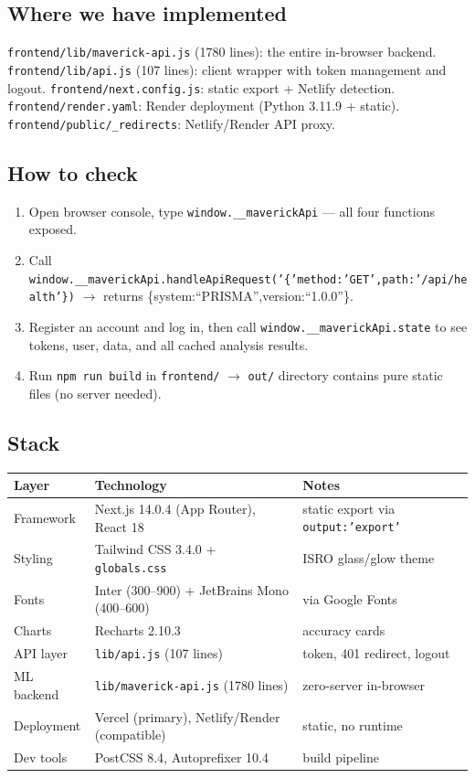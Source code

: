 \documentclass[11pt,a4paper]{article}
\newcommand{\code}[1]{\texttt{\small #1}}
\begin{document}
\subsection*{Where we have implemented}
\code{frontend/lib/maverick-api.js} (1780 lines): the entire in-browser backend.
\code{frontend/lib/api.js} (107 lines): client wrapper with token management and logout.
\code{frontend/next.config.js}: static export + Netlify detection.
\code{frontend/render.yaml}: Render deployment (Python 3.11.9 + static).
\code{frontend/public/\_redirects}: Netlify/Render API proxy.

\subsection*{How to check}
\begin{enumerate}[leftmargin=1.5em]
  \item Open browser console, type \code{window.\_\_maverickApi} --- all four functions exposed.
  \item Call \code{window.\_\_maverickApi.handleApiRequest('\{'method:'GET',path:'/api/health'\})}
        $\rightarrow$ returns \{system:``PRISMA'',version:``1.0.0''\}.
  \item Register an account and log in, then call \code{window.\_\_maverickApi.state} to see
        tokens, user, data, and all cached analysis results.
  \item Run \code{npm run build} in \code{frontend/} $\rightarrow$ \code{out/} directory contains
        pure static files (no server needed).
\end{enumerate}

\subsection*{Stack}
\begin{center}
\begin{tabular}{@{}lll@{}}
\toprule
\textbf{Layer} & \textbf{Technology} & \textbf{Notes}\\
\midrule
Framework & Next.js 14.0.4 (App Router), React 18 & static export via \code{output:'export'}\\
Styling & Tailwind CSS 3.4.0 + \code{globals.css} & ISRO glass/glow theme\\
Fonts & Inter (300--900) + JetBrains Mono (400--600) & via Google Fonts\\
Charts & Recharts 2.10.3 & accuracy cards\\
API layer & \code{lib/api.js} (107 lines) & token, 401 redirect, logout\\
ML backend & \code{lib/maverick-api.js} (1780 lines) & zero-server in-browser\\
Deployment & Vercel (primary), Netlify/Render (compatible) & static, no runtime\\
Dev tools & PostCSS 8.4, Autoprefixer 10.4 & build pipeline\\
\bottomrule
\end{tabular}
\end{center}
\end{document}
